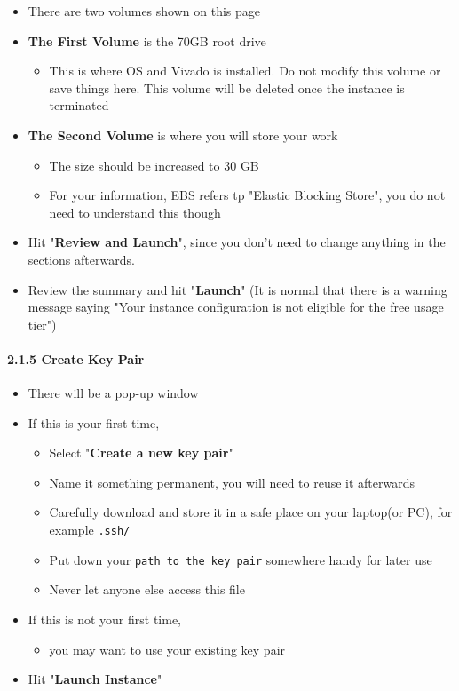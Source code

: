 \documentclass[]{article}
\let\oldparagraph\paragraph
\renewcommand{\paragraph}[1]{\oldparagraph{#1}\mbox{}}
\begin{document}
\begin{itemize}
\item
  There are two volumes shown on this page 
\item
  \textbf{The First Volume} is the 70GB root drive

  \begin{itemize}
  \item
    This is where OS and Vivado is installed. Do not modify this volume
    or save things here. This volume will be deleted once the instance
    is terminated
  \end{itemize}
\item
  \textbf{The Second Volume} is where you will store your work

  \begin{itemize}
  \item
    The size should be increased to 30 GB
  \item
    For your information, EBS refers tp "Elastic Blocking Store", you do
    not need to understand this though
  \end{itemize}
\item
  Hit "\textbf{Review and Launch}", since you don't need to change
  anything in the sections afterwards.
\item
  Review the summary and hit "\textbf{Launch}" (It is normal that there
  is a warning message saying "Your instance configuration is not
  eligible for the free usage tier")
\end{itemize}

\hypertarget{header-n168}{%
\paragraph{2.1.5 Create Key Pair}\label{header-n168}}

\begin{itemize}
\item
  There will be a pop-up window
\item
  If this is your first time,

  \begin{itemize}
  \item
    Select "\textbf{Create a new key pair}"
  \item
    Name it something permanent, you will need to reuse it afterwards
  \item
    Carefully download and store it in a safe place on your laptop(or
    PC), for example \texttt{.ssh/}
  \item
    Put down your \texttt{path\ to\ the\ key\ pair} somewhere handy for
    later use 
  \item
    Never let anyone else access this file
  \end{itemize}
\item
  If this is not your first time,

  \begin{itemize}
  \item
    you may want to use your existing key pair
  \end{itemize}
\item
  Hit "\textbf{Launch Instance}"
\end{itemize}
\end{document}
